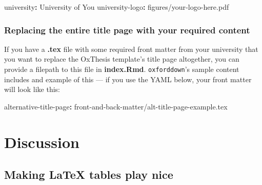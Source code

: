 \documentclass[a4paper, nobind]{templates/ociamthesis}
\newenvironment{Shaded}{\begin{snugshade}}{\end{snugshade}}
\newcommand{\AttributeTok}[1]{\textcolor[rgb]{0.77,0.63,0.00}{#1}}
\newcommand{\FunctionTok}[1]{\textcolor[rgb]{0.00,0.00,0.00}{#1}}
\newcommand{\KeywordTok}[1]{\textcolor[rgb]{0.13,0.29,0.53}{\textbf{#1}}}
\renewenvironment{Shaded}
{
  \vspace{10pt}%
  \begin{snugshade}%
}{%
  \end{snugshade}%
  \vspace{8pt}%
}
\begin{document}
\begin{Shaded}
\begin{Highlighting}[]
\FunctionTok{university}\KeywordTok{:}\AttributeTok{ University of You}
\FunctionTok{university{-}logo}\KeywordTok{:}\AttributeTok{ figures/your{-}logo{-}here.pdf}
\end{Highlighting}
\end{Shaded}

\hypertarget{replacing-the-entire-title-page-with-your-required-content}{%
\subsection{Replacing the entire title page with your required content}\label{replacing-the-entire-title-page-with-your-required-content}}

If you have a \textbf{.tex} file with some required front matter from your university that you want to replace the OxThesis template's title page altogether, you can provide a filepath to this file in \textbf{index.Rmd}.
\texttt{oxforddown}'s sample content includes and example of this --- if you use the YAML below, your front matter will look like this:

\begin{Shaded}
\begin{Highlighting}[]
\FunctionTok{alternative{-}title{-}page}\KeywordTok{:}\AttributeTok{ front{-}and{-}back{-}matter/alt{-}title{-}page{-}example.tex}
\end{Highlighting}
\end{Shaded}

\noindent
{}     

\hypertarget{tables}{%
\chapter{Discussion}\label{tables}}

\minitoc 

\hypertarget{making-latex-tables-play-nice}{%
\section{Making LaTeX tables play nice}\label{making-latex-tables-play-nice}}
\end{document}
